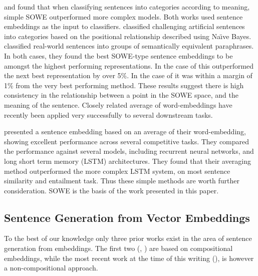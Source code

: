 \documentclass[compsoc]{IEEEtran}
\theoremstyle{plain}
\theoremstyle{definition}
\begin{document}
\textcite{RitterPosition} and \textcite{White2015SentVecMeaning} found that when classifying sentences into categories according to meaning, simple SOWE outperformed more complex models. Both works used sentence embeddings as the input to classifiers. \textcite{RitterPosition} classified challenging artificial sentences into categories based on the positional relationship described using Na{\"\i}ve Bayes. \textcite{White2015SentVecMeaning} classified real-world sentences into groups of semantically equivalent paraphrases. In both cases, they found the best SOWE-type sentence embeddings to be amongst the highest performing representations. In the case of \textcite{RitterPosition} this outperformed the next best representation by over 5\%. In the case of \textcite{White2015SentVecMeaning} it was within a margin of 1\% from the very best performing method. These results suggest there is high consistency in the relationship between a point in the SOWE space, and the meaning of the sentence. Closely related average of word-embeddings have recently been applied very successfully to several downstream tasks.

\textcite{wieting2015towards} presented a sentence embedding based on an average of their word-embedding, showing excellent performance across several competitive tasks. They compared the performance against several models, including recurrent neural networks, and long short term memory (LSTM) architectures. They found that their averaging method outperformed the more complex LSTM system, on most sentence similarity and entailment task. Thus these simple methods are worth further consideration. SOWE is the basis of the work presented in this paper.


\subsection{Sentence Generation from Vector Embeddings}

To the best of our knowledge only three prior works exist in the area of sentence generation from embeddings. The first two (\textcite{Dinu2014CompositionalGeneration}, \textcite{iyyer2014generating}) are based on compositional embeddings, while the most recent work at the time of this writing (\textcite{Bowman2015SmoothGeneration}), is however a non-compositional approach.


\renewcommand{\u}{\tilde{u}}
\end{document}
